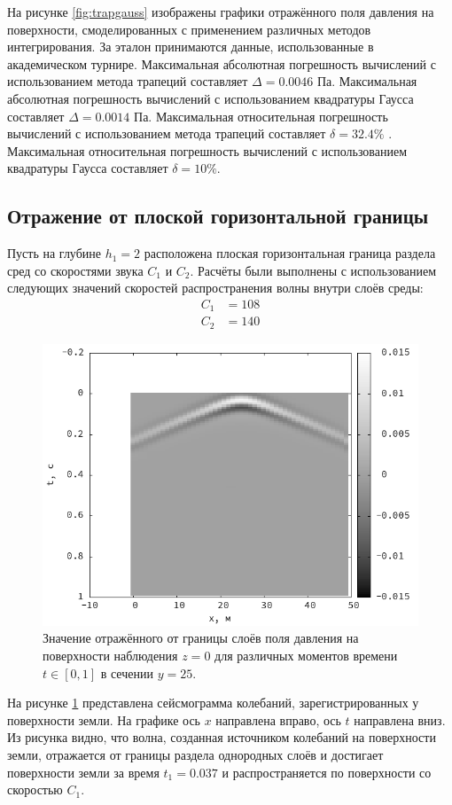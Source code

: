 \documentclass[a4paper, fontsize=14pt]{article}
\begin{document}
	На рисунке \ref{fig:trapgauss} изображены графики отражённого поля давления на поверхности, смоделированных с применением различных методов интегрирования. За эталон принимаются данные, использованные в академическом турнире.  Максимальная абсолютная погрешность вычислений с  использованием метода трапеций составляет $\Delta = 0.0046$ Па.
	Максимальная абсолютная погрешность вычислений с  использованием квадратуры  Гаусса составляет $\Delta = 0.0014$ Па.
	Максимальная относительная погрешность вычислений с  использованием метода трапеций составляет $\delta = 32.4\%$ .
	Максимальная относительная погрешность вычислений с  использованием квадратуры  Гаусса составляет $\delta = 10\%$.
	
	
	\subsection{Отражение от плоской горизонтальной границы} \label{sect:horizontal}
	
	Пусть на глубине $h_1 = 2$ расположена плоская горизонтальная граница раздела сред со скоростями звука $C_1$ и $C_2$. 
	Расчёты были выполнены с использованием следующих значений скоростей распространения волны внутри слоёв среды:
\begin{align*}
	C_1 &= 108 \\
	C_2 &= 140 
\end{align*}
	
\begin{figure}[H]
	\centering
	\includegraphics[width=.7\textwidth]{smooth_single_seism.png}
	\caption{Значение отражённого от границы слоёв поля давления на поверхности наблюдения $z = 0$ для различных моментов времени $t\in [0,1]$ в сечении $y=25$.}
	\label{fig:single_hor}
\end{figure}
	На рисунке \ref{fig:single_hor} представлена сейсмограмма колебаний, зарегистрированных у поверхности земли. На графике ось $x$ направлена вправо, ось $t$ направлена  вниз.
	Из рисунка видно, что волна, созданная источником колебаний на поверхности земли, отражается от границы раздела однородных слоёв и достигает поверхности земли за время $t_1 = 0.037$ и распространяется по поверхности со скоростью $C_1$. 
\end{document}
